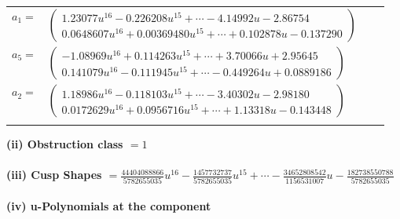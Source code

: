 \documentclass[1p]{elsarticle_modified}
\theoremstyle{definition}
\begin{document}
\begin{tabular}{m{7pt} m{180pt} m{7pt} m{180pt} }
\flushright $a_{1}=$&$\begin{pmatrix}1.23077 u^{16}-0.226208 u^{15}+\cdots-4.14992 u-2.86754\\0.0648607 u^{16}+0.00369480 u^{15}+\cdots+0.102878 u-0.137290\end{pmatrix}$ \\
\flushright $a_{5}=$&$\begin{pmatrix}-1.08969 u^{16}+0.114263 u^{15}+\cdots+3.70066 u+2.95645\\0.141079 u^{16}-0.111945 u^{15}+\cdots-0.449264 u+0.0889186\end{pmatrix}$ \\
\flushright $a_{2}=$&$\begin{pmatrix}1.18986 u^{16}-0.118103 u^{15}+\cdots-3.40302 u-2.98180\\0.0172629 u^{16}+0.0956716 u^{15}+\cdots+1.13318 u-0.143448\end{pmatrix}$\\&\end{tabular}
\flushleft \textbf{(ii) Obstruction class $= 1$}\\~\\
\flushleft \textbf{(iii) Cusp Shapes $= \frac{44404088866}{5782655035} u^{16}-\frac{1457732737}{5782655035} u^{15}+\cdots-\frac{34652808542}{1156531007} u-\frac{182738550788}{5782655035}$}\\~\\
\newpage\renewcommand{\arraystretch}{1}
\flushleft \textbf{(iv) u-Polynomials at the component}\newline \\
\end{document}
